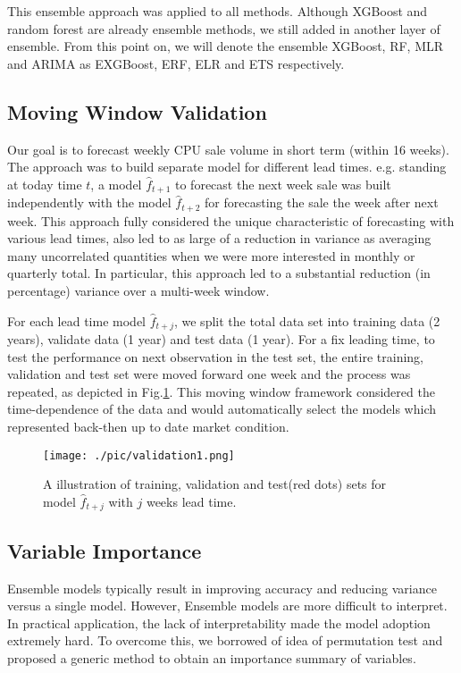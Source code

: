 \documentclass{llncs}
\begin{document}
This ensemble approach was applied to all methods. Although XGBoost and random forest are already ensemble methods, we still added in another layer of ensemble. From this point on, we will denote the ensemble XGBoost, RF, MLR and ARIMA as EXGBoost, ERF, ELR and ETS respectively. 

\subsection{Moving Window Validation}
\label{sec:window}
Our goal is to forecast weekly CPU sale volume in short term (within 16 weeks). The approach was to build separate model for different lead times. e.g. standing at today time $t$, a model $\hat{f}_{t+1}$ to forecast the next week sale was built independently with the model $\hat{f}_{t+2}$ for forecasting the sale the week after next week. This approach fully considered the unique characteristic of forecasting with various lead times, also led to as large of a reduction in variance as averaging many uncorrelated quantities when we were more interested in monthly or quarterly total. In particular, this approach led to a substantial reduction (in percentage) variance over a multi-week window. 

For each lead time model $\hat{f}_{t+j}$, we split the total data set into training data (2 years), validate data (1 year) and test data (1 year). For a fix leading time, to test the performance on next observation in the test set, the entire training, validation and test set were moved forward one week and the process was repeated, as depicted in Fig.\ref{fig:validation1}. This moving window framework considered the time-dependence of the data and would automatically select the models which represented back-then up to date market condition.

\begin{figure}[ht]
	\centering 
    \texttt{[image: ./pic/validation1.png]}
    \caption{A illustration of training, validation and test(red dots) sets for model $\hat{f}_{t+j}$ with $j$ weeks lead time.}
    \label{fig:validation1}
\end{figure}


\subsection{Variable Importance}
\label{sec:variable}
Ensemble models typically result in improving accuracy and reducing variance versus a single model. However, Ensemble models are more difficult to interpret. In practical application, the lack of interpretability made the model adoption extremely hard. To overcome this, we borrowed of idea of permutation test and proposed a generic method to obtain an importance summary of variables.
\end{document}
